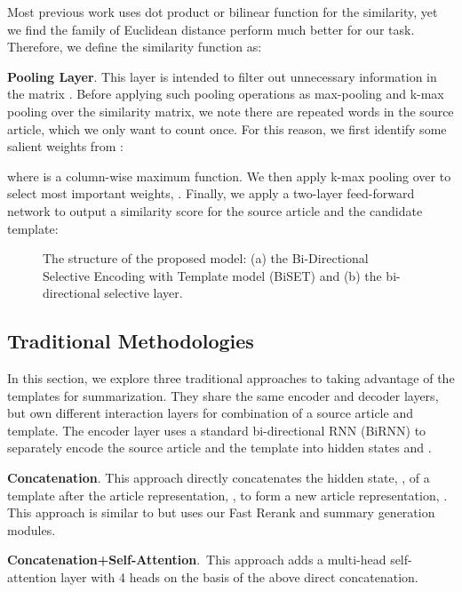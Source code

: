 \documentclass[11pt,a4paper]{article}
\begin{document}
\begin{spacing}{1.0}
Most previous work uses dot product or bilinear function \cite{chen2016thorough} for the similarity, yet we find the family of Euclidean distance perform much better for our task. Therefore, we define the similarity function as:


\noindent\textbf{Pooling Layer}. This layer is intended to filter out unnecessary information in the matrix . Before applying such pooling operations as max-pooling and k-max pooling \cite{kalchbrenner2014convolutional} over the similarity matrix, we note there are repeated words in the source article, which we only want to count once. For this reason, we first identify some salient weights from :

where  is a column-wise maximum function. We then apply k-max pooling over  to select  most important weights, . Finally, we apply a two-layer feed-forward network to output a similarity score for the source article and the candidate template:


\begin{figure*}[t]
\centering
{}
\hspace{0.1in}
\caption{The structure of the proposed model: (a) the Bi-Directional Selective Encoding with Template model (BiSET) and (b) the bi-directional selective layer.}
\label{img:model} \end{figure*}



\subsection{Traditional Methodologies}\label{section:interaction_methods}
In this section, we explore three traditional approaches to taking advantage of the templates for summarization. They share the same encoder and decoder layers, but own different interaction layers for combination of a source article and template. The encoder layer uses a standard bi-directional RNN (BiRNN) to separately encode the source article and the template into hidden states  and .

\noindent\textbf{Concatenation}. This approach directly concatenates the hidden state, , of a template after the article representation, , to form a new article representation, . This approach is similar to  \cite{cao2018retrieve} but uses our Fast Rerank and summary generation modules.

\noindent\textbf{Concatenation+Self-Attention}.~This approach adds a multi-head self-attention  \cite{Vaswani2017Attention} layer with 4 heads on the basis of the above direct concatenation.


\end{spacing}
\end{document}
